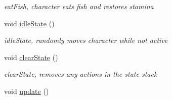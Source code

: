 \begin{DoxyCompactItemize}
\begin{DoxyCompactList}\small\item\em eat\+Fish, character eats fish and restores stamina \end{DoxyCompactList}\item 
\hypertarget{class_character_ae815a202f51691a0fc1108654be02af1}{}void \hyperlink{class_character_ae815a202f51691a0fc1108654be02af1}{idle\+State} ()\label{class_character_ae815a202f51691a0fc1108654be02af1}

\begin{DoxyCompactList}\small\item\em idle\+State, randomly moves character while not active \end{DoxyCompactList}\item 
\hypertarget{class_character_aa26ed8c334ec818d301ad427adbd5ba6}{}void \hyperlink{class_character_aa26ed8c334ec818d301ad427adbd5ba6}{clear\+State} ()\label{class_character_aa26ed8c334ec818d301ad427adbd5ba6}

\begin{DoxyCompactList}\small\item\em clear\+State, removes any actions in the state stack \end{DoxyCompactList}\item 
\hypertarget{class_character_ab9168412ef9b2c8726b0de4dfb63e604}{}void \hyperlink{class_character_ab9168412ef9b2c8726b0de4dfb63e604}{update} ()\label{class_character_ab9168412ef9b2c8726b0de4dfb63e604}


\end{DoxyCompactItemize}
